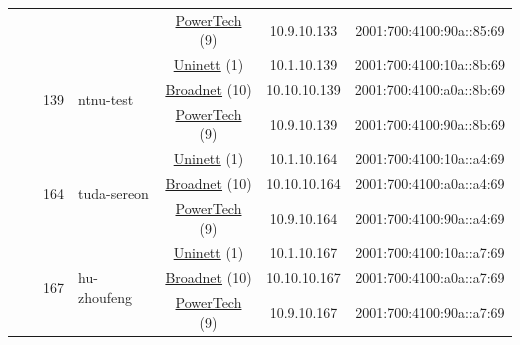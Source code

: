 \begin{small}
\begin{center}
\begin{longtable}{|c|c|c|c|c|c|c|c|}
  &  &  &  & \multicolumn{2}{|c|}{\tiny{\href{http://www.powertech.no}{PowerTech} (9)}} & \tiny{10.9.10.133} & \tiny{2001:700:4100:90a::85:69} \\* \cline{3-3}\cline{4-4}\cline{5-5}\cline{6-6}\cline{7-7}\cline{8-8}
  &  & \multirow{3}{*}{\tiny{139}} & \multicolumn{1}{|l|}{\multirow{3}{*}{\tiny{ntnu-test}}} & \multicolumn{2}{|c|}{\tiny{\href{https://www.uninett.no}{Uninett} (1)}} & \tiny{10.1.10.139} & \tiny{2001:700:4100:10a::8b:69} \\* \cline{5-5}\cline{6-6}\cline{7-7}\cline{8-8}
  &  &  &  & \multicolumn{2}{|c|}{\tiny{\href{https://www.broadnet.no}{Broadnet} (10)}} & \tiny{10.10.10.139} & \tiny{2001:700:4100:a0a::8b:69} \\* \cline{5-5}\cline{6-6}\cline{7-7}\cline{8-8}
  &  &  &  & \multicolumn{2}{|c|}{\tiny{\href{http://www.powertech.no}{PowerTech} (9)}} & \tiny{10.9.10.139} & \tiny{2001:700:4100:90a::8b:69} \\* \cline{3-3}\cline{4-4}\cline{5-5}\cline{6-6}\cline{7-7}\cline{8-8}
  &  & \multirow{3}{*}{\tiny{164}} & \multicolumn{1}{|l|}{\multirow{3}{*}{\tiny{tuda-sereon}}} & \multicolumn{2}{|c|}{\tiny{\href{https://www.uninett.no}{Uninett} (1)}} & \tiny{10.1.10.164} & \tiny{2001:700:4100:10a::a4:69} \\* \cline{5-5}\cline{6-6}\cline{7-7}\cline{8-8}
  &  &  &  & \multicolumn{2}{|c|}{\tiny{\href{https://www.broadnet.no}{Broadnet} (10)}} & \tiny{10.10.10.164} & \tiny{2001:700:4100:a0a::a4:69} \\* \cline{5-5}\cline{6-6}\cline{7-7}\cline{8-8}
  &  &  &  & \multicolumn{2}{|c|}{\tiny{\href{http://www.powertech.no}{PowerTech} (9)}} & \tiny{10.9.10.164} & \tiny{2001:700:4100:90a::a4:69} \\* \cline{3-3}\cline{4-4}\cline{5-5}\cline{6-6}\cline{7-7}\cline{8-8}
  &  & \multirow{3}{*}{\tiny{167}} & \multicolumn{1}{|l|}{\multirow{3}{*}{\tiny{hu-zhoufeng}}} & \multicolumn{2}{|c|}{\tiny{\href{https://www.uninett.no}{Uninett} (1)}} & \tiny{10.1.10.167} & \tiny{2001:700:4100:10a::a7:69} \\* \cline{5-5}\cline{6-6}\cline{7-7}\cline{8-8}
  &  &  &  & \multicolumn{2}{|c|}{\tiny{\href{https://www.broadnet.no}{Broadnet} (10)}} & \tiny{10.10.10.167} & \tiny{2001:700:4100:a0a::a7:69} \\* \cline{5-5}\cline{6-6}\cline{7-7}\cline{8-8}
  &  &  &  & \multicolumn{2}{|c|}{\tiny{\href{http://www.powertech.no}{PowerTech} (9)}} & \tiny{10.9.10.167} & \tiny{2001:700:4100:90a::a7:69} \\* \cline{3-3}\cline{4-4}\cline{5-5}\cline{6-6}\cline{7-7}\cline{8-8}

\end{longtable}
\end{center}
\end{small}
